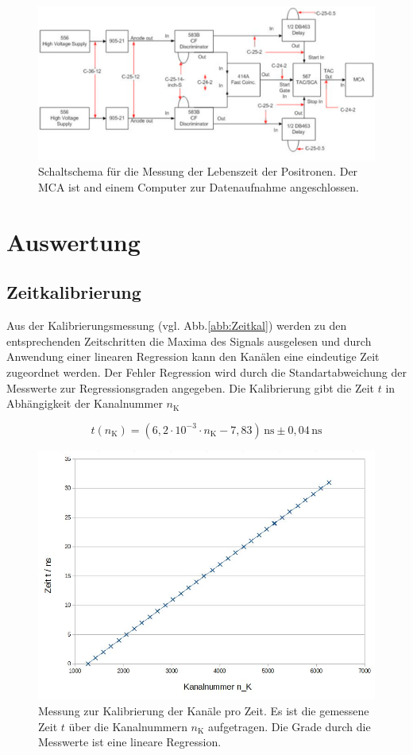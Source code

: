 \documentclass[numbers=noenddot,12pt,a4paper]{scrartcl}
\begin{document}
	    		\begin{figure}[!h]
	    			\centering
	    			\label{abb:aufbau}
	    			\includegraphics[width=1\columnwidth]{pics/aufbau}
	    			\caption{Schaltschema für die Messung der Lebenszeit der Positronen. Der MCA ist and einem Computer zur Datenaufnahme angeschlossen.}
	    		\end{figure}
	    
\newpage

\section{Auswertung}
	
	\subsection{Zeitkalibrierung}

		Aus der Kalibrierungsmessung (vgl. Abb.\eqref{abb:Zeitkal}) werden zu den entsprechenden Zeitschritten die Maxima des Signals ausgelesen und durch Anwendung einer linearen Regression kann den Kanälen eine eindeutige Zeit zugeordnet werden. Der Fehler Regression wird durch die Standartabweichung der Messwerte zur Regressionsgraden angegeben. Die Kalibrierung gibt die Zeit $t$ in Abhängigkeit der Kanalnummer $n_\textrm{K}$
		
		\begin{equation}
			\label{eq:Zeitkal}
			t(n_\textrm{K}) = (6,2\cdot 10^{-3}\cdot n_\textrm{K} - 7,83) \,\mathrm{ns} \pm 0,04\,\mathrm{ns}
		\end{equation}
		
		\begin{figure}[!h]
			\centering
			\label{abb:Zeitkal}
			\includegraphics[width=0.7\columnwidth]{pics/Zeitkal}
			\caption{Messung zur Kalibrierung der Kanäle pro Zeit. Es ist die gemessene Zeit $t$ über die Kanalnummern $n_\textrm{K}$ aufgetragen. Die Grade durch die Messwerte ist eine lineare Regression.}
		\end{figure}
		\newpage
\end{document}
